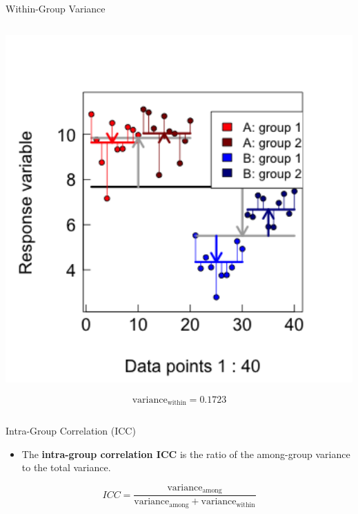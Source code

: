 \documentclass{beamer}
\begin{document}
\begin{frame}{Within-Group Variance}
\begin{columns}[onlytextwidth]
\begin{column}{0.5\textwidth}
\begin{center}
        \includegraphics[width=0.999\textwidth]{lectures/day_1_intro_to_mems/figures/unnamed-chunk-36-1.png}
      \end{center}
        \[ \text{variance}_{\text{within}} = 0.1723 \]
    \end{column}
  \end{columns}

\end{frame}



\begin{frame}{Intra-Group Correlation (ICC)}
  \begin{itemize}
    \item The \textbf{intra-group correlation ICC} is the ratio of the among-group variance to the total variance.
  \end{itemize}

  \begin{equation*}
    ICC = \frac{\text{variance}_{\text{among}}}{\text{variance}_{\text{among}} + \text{variance}_{\text{within}}}
  \end{equation*}
\end{frame}
\end{document}
